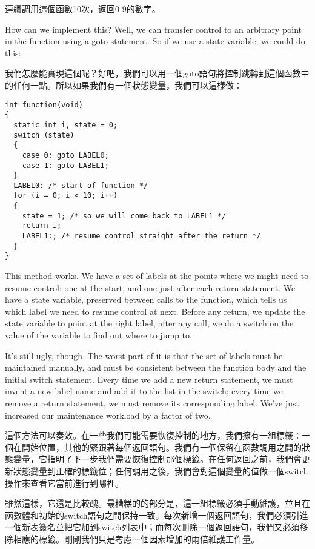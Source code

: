 \documentclass[12pt]{article}
\begin{document}
\begin{CJK}{UTF8}{bsmi}
連續調用這個函數10次，返回0-9的數字。 

How can we implement this? Well, we can transfer control to an arbitrary point in the function using a goto statement. So if we use a state variable, we could do this:

我們怎麼能實現這個呢？好吧，我們可以用一個goto語句將控制跳轉到這個函數中的任何一點。所以如果我們有一個狀態變量，我們可以這樣做： 

\begin{lstlisting}[basicstyle=\footnotesize, breaklines=true]
int function(void) 
{
  static int i, state = 0;
  switch (state) 
  {
    case 0: goto LABEL0;
    case 1: goto LABEL1;
  }
  LABEL0: /* start of function */
  for (i = 0; i < 10; i++) 
  {
    state = 1; /* so we will come back to LABEL1 */
    return i;
    LABEL1:; /* resume control straight after the return */
  }
}
\end{lstlisting}

This method works. We have a set of labels at the points where we might need to resume control: one at the start, and one just after each return statement. We have a state variable, preserved between calls to the function, which tells us which label we need to resume control at next. Before any return, we update the state variable to point at the right label; after any call, we do a switch on the value of the variable to find out where to jump to.

It's still ugly, though. The worst part of it is that the set of labels must be maintained manually, and must be consistent between the function body and the initial switch statement. Every time we add a new return statement, we must invent a new label name and add it to the list in the switch; every time we remove a return statement, we must remove its corresponding label. We've just increased our maintenance workload by a factor of two.

這個方法可以奏效。在一些我們可能需要恢復控制的地方，我們擁有一組標籤：一個在開始位置，其他的緊跟著每個返回語句。我們有一個保留在函數調用之間的狀態變量，它指明了下一步我們需要恢復控制那個標籤。在任何返回之前，我們會更新狀態變量到正確的標籤位；任何調用之後，我們會對這個變量的值做一個switch操作來查看它當前進行到哪裡。

雖然這樣，它還是比較醜。最糟糕的的部分是，這一組標籤必須手動維護，並且在函數體和初始的switch語句之間保持一致。每次新增一個返回語句，我們必須引進一個新表簽名並把它加到switch列表中；而每次刪除一個返回語句，我們又必須移除相應的標籤。剛剛我們只是考慮一個因素增加的兩倍維護工作量。


\end{CJK}
\end{document}
